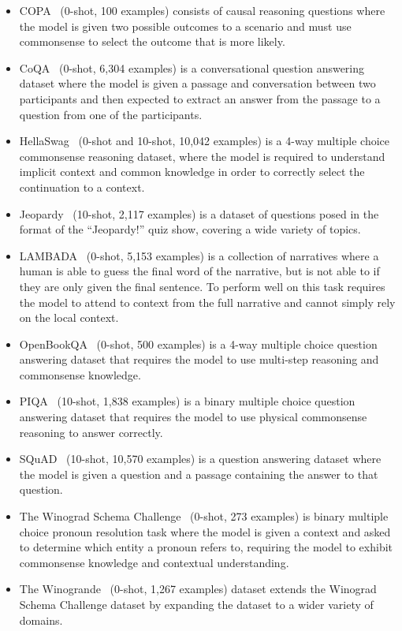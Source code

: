 \documentclass{article}
\begin{document}
\begin{itemize}
    \item
    COPA~\citep{copa} (0-shot, 100 examples) consists of causal reasoning questions where the model is given two possible outcomes to a scenario and must use commonsense to select the outcome that is more likely.
    \item
    CoQA~\citep{reddy-etal-2019-coqa} (0-shot, 6,304 examples) is a conversational question answering dataset where the model is given a passage and conversation between two participants and then expected to extract an answer from the passage to a question from one of the participants.
    \item
    HellaSwag~\citep{hellaswag} (0-shot and 10-shot, 10,042 examples) is a 4-way multiple choice commonsense reasoning dataset, where the model is required to understand implicit context and common knowledge in order to correctly select the continuation to a context.
    \item
    Jeopardy~\citep{kaggle200000Jeopardy} (10-shot, 2,117 examples) is a dataset of questions posed in the format of the ``Jeopardy!'' quiz show, covering a wide variety of topics.
    \item
    LAMBADA~\citep{lambada} (0-shot, 5,153 examples) is a collection of narratives where a human is able to guess the final word of the narrative, but is not able to if they are only given the final sentence. To perform well on this task requires the model to attend to context from the full narrative and cannot simply rely on the local context.
    \item
    OpenBookQA~\citep{OpenBookQA2018} (0-shot, 500 examples) is a 4-way multiple choice question answering dataset that requires the model to use multi-step reasoning and commonsense knowledge.
    \item
    PIQA~\citep{piqa} (10-shot, 1,838 examples) is a binary multiple choice question answering dataset that requires the model to use physical commonsense reasoning to answer correctly.
    \item
    SQuAD~\citep{squad} (10-shot, 10,570 examples) is a question answering dataset where the model is given a question and a passage containing the answer to that question.
    \item
    The Winograd Schema Challenge~\citep{winograd} (0-shot, 273 examples) is binary multiple choice pronoun resolution task where the model is given a context and asked to determine which entity a pronoun refers to, requiring the model to exhibit commonsense knowledge and contextual understanding.
    \item
    The Winogrande~\citep{sakaguchi2019winogrande} (0-shot, 1,267 examples) dataset extends the Winograd Schema Challenge dataset by expanding the dataset to a wider variety of domains.
\end{itemize}
\end{document}
